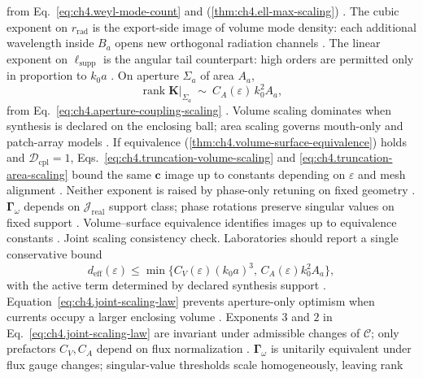 from Eq.~\eqref{eq:ch4.weyl-mode-count} and (\ref{thm:ch4.ell-max-scaling}) \cite{stratton1941}. The cubic
exponent on \(r_{\mathrm{rad}}\) is the export-side image of volume mode density: each additional wavelength inside \(B_{a}\) opens new
orthogonal radiation channels \cite{harrington2001}. The linear exponent on \(\ell_{\mathrm{supp}}\) is the angular tail counterpart: high
orders are permitted only in proportion to \(k_{0}a\) \cite{hansen1988}. On aperture \(\Sigma_{a}\) of area \(A_{a}\),
\begin{equation}
\label{eq:ch4.truncation-area-scaling}
\operatorname{rank}\mathbf{K}\big|_{\Sigma_{a}}
\ \sim\
C_{A}(\varepsilon)\,k_{0}^{2}A_{a},
\end{equation}
from Eq.~\eqref{eq:ch4.aperture-coupling-scaling} \cite{collin2001}. Volume scaling dominates when synthesis is
declared on the enclosing ball; area scaling governs mouth-only and patch-array models \cite{stratton1941}.
\phantomsection\label{prop:ch4.truncation-scaling-consistency}
If equivalence (\ref{thm:ch4.volume-surface-equivalence}) holds and \(\mathcal{D}_{\mathrm{cpl}}=1\),
Eqs.~\eqref{eq:ch4.truncation-volume-scaling} and \eqref{eq:ch4.truncation-area-scaling} bound the same \(\mathbf{c}\) image up to
constants depending on \(\varepsilon\) and mesh alignment \cite{stratton1941}. Neither exponent is raised by phase-only retuning on fixed geometry \cite{devaney2004}.
\(\boldsymbol{\Gamma}_\omega\) depends on \(\mathcal{J}_{\mathrm{real}}\) support class; phase rotations preserve singular values on fixed
support \cite{harrington2001}. Volume--surface equivalence identifies images up to equivalence constants \cite{collin2001}.
Joint scaling consistency check. Laboratories should report a single conservative bound
\begin{equation}
\label{eq:ch4.joint-scaling-law}
d_{\mathrm{eff}}(\varepsilon)\le\min\big\{C_{V}(\varepsilon)(k_{0}a)^{3},\,C_{A}(\varepsilon)k_{0}^{2}A_{a}\big\},
\end{equation}
with the active term determined by declared synthesis support \cite{stratton1941}. Equation~\eqref{eq:ch4.joint-scaling-law}
prevents aperture-only optimism when currents occupy a larger enclosing volume \cite{devaney2004}.
\phantomsection\label{thm:ch4.scaling-gauge-invariant}
Exponents \(3\) and \(2\) in Eq.~\eqref{eq:ch4.joint-scaling-law} are invariant under admissible changes of \(\mathcal{C}\); only
prefactors \(C_{V},C_{A}\) depend on flux normalization \cite{hansen1988}.
\(\boldsymbol{\Gamma}_\omega\) is unitarily equivalent under flux gauge changes; singular-value thresholds scale homogeneously, leaving rank
